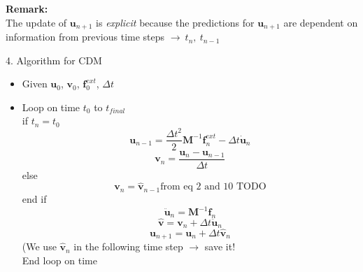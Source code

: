\documentclass[10pt,a4paper]{article}
\begin{document}
\textbf{Remark:} \\
The update of $\bm u_{n+1}$ is \textit{explicit} because the predictions for $\bm u_{n+1}$ are dependent on information from previous time steps $\rightarrow ~ t_n,~t_{n-1}$

4. Algorithm for CDM
\begin{itemize}
\item Given $\bm u_0$, $\bm v_0$, $\bm f_0^{ext}$, $\Delta t$
\item Loop on time $t_0$ to $t_{final}$ \\
if $t_n = t_0$
\[ \bm u_{n-1} = \frac{\Delta t^2}{2} \bm M^{-1} \bm f_n^{ext} - \Delta t \bm{\dot{u}}_n \]
\[ \bm v_n = \frac{\bm u_n - \bm u_{n-1}}{\Delta t} \]
else
\[ \bm v_n = \bm{\hat{v}}_{n-1} \text{from eq 2 and 10 TODO} \]
end if
\[ \bm{\ddot{u}}_n = \bm M^{-1} \bm f_n \]
\[ \bm{\hat v} = \bm v_n + \Delta t \ddot{\bm u}_n \]
\[ \bm u_{n+1} = \bm u_n + \Delta t \bm{\hat v}_n \]
(We use $\bm{\hat v}_n$ in the following time step $\rightarrow$ save it! \\
End loop on time
\end{itemize}
\end{document}
